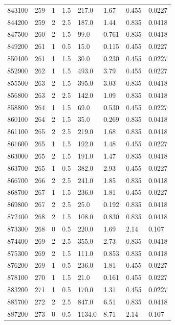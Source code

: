 \documentclass[preview]{standalone}
\begin{document}
{{{{{{{{{{{\begin{tabular}{L{1.2cm}C{1.2cm} C{0.3cm}C{0.5cm} C{1.4cm}C{1.4cm} C{1.4cm}C{1.4cm}}
  843100  &   259  & 1     & 1.5 &  217.0  & 1.67  & 0.455 &  0.0227   \\ 
  844200  &   259  & 2     & 2.5 &  187.0  & 1.44  & 0.835 &  0.0418   \\ 
  847500  &   260  & 2     & 1.5 &  99.0  & 0.761  & 0.835 &  0.0418   \\ 
  849200  &   261  & 1     & 0.5 &  15.0  & 0.115  & 0.455 &  0.0227   \\ 
  850100  &   261  & 1     & 1.5 &  30.0  & 0.230  & 0.455 &  0.0227   \\ 
  852900  &   262  & 1     & 1.5 &  493.0  & 3.79  & 0.455 &  0.0227   \\ 
  855500  &   263  & 2     & 1.5 &  395.0  & 3.03  & 0.835 &  0.0418   \\ 
  856800  &   263  & 2     & 2.5 &  142.0  & 1.09  & 0.835 &  0.0418   \\ 
  858800  &   264  & 1     & 1.5 &  69.0  & 0.530  & 0.455 &  0.0227   \\ 
  860100  &   264  & 2     & 1.5 &  35.0  & 0.269  & 0.835 &  0.0418   \\ 
  861100  &   265  & 2     & 2.5 &  219.0  & 1.68  & 0.835 &  0.0418   \\ 
  861600  &   265  & 1     & 1.5 &  192.0  & 1.48  & 0.455 &  0.0227   \\ 
  863000  &   265  & 2     & 1.5 &  191.0  & 1.47  & 0.835 &  0.0418   \\ 
  863700  &   265  & 1     & 0.5 &  382.0  & 2.93  & 0.455 &  0.0227   \\ 
  866700  &   266  & 2     & 2.5 &  241.0  & 1.85  & 0.835 &  0.0418   \\ 
  868700  &   267  & 1     & 1.5 &  236.0  & 1.81  & 0.455 &  0.0227   \\ 
  869800  &   267  & 2     & 2.5 &  25.0  & 0.192  & 0.835 &  0.0418   \\ 
  872400  &   268  & 2     & 1.5 &  108.0  & 0.830  & 0.835 &  0.0418   \\ 
  873300  &   268  & 0     & 0.5 &  220.0  & 1.69  & 2.14 &  0.107   \\ 
  874400  &   269  & 2     & 2.5 &  355.0  & 2.73  & 0.835 &  0.0418   \\ 
  875300  &   269  & 2     & 1.5 &  111.0  & 0.853  & 0.835 &  0.0418   \\ 
  876200  &   269  & 1     & 0.5 &  236.0  & 1.81  & 0.455 &  0.0227   \\ 
  878100  &   270  & 1     & 1.5 &  21.0  & 0.161  & 0.455 &  0.0227   \\ 
  883200  &   271  & 1     & 0.5 &  170.0  & 1.31  & 0.455 &  0.0227   \\ 
  885700  &   272  & 2     & 2.5 &  847.0  & 6.51  & 0.835 &  0.0418   \\ 
  887200  &   273  & 0     & 0.5 &  1134.0  & 8.71  & 2.14 &  0.107   \\ 
\hline 
\end{tabular} 

}}}}}}}}}}}
\end{document}
